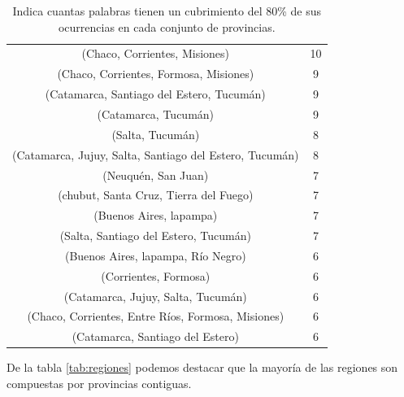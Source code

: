 \begin{table}[]
\begin{tabular}{|c|c|}
(Chaco, Corrientes, Misiones)                          & 10          \\
(Chaco, Corrientes, Formosa, Misiones)                 & 9           \\
(Catamarca, Santiago del Estero, Tucumán)              & 9           \\
(Catamarca, Tucumán)                                   & 9           \\
(Salta, Tucumán)                                       & 8           \\
(Catamarca, Jujuy, Salta, Santiago del Estero, Tucumán)& 8           \\
(Neuquén, San Juan)                                    & 7           \\ %
(chubut, Santa Cruz, Tierra del Fuego)                 & 7           \\
(Buenos Aires, lapampa)                                & 7           \\
(Salta, Santiago del Estero, Tucumán)                  & 7           \\
(Buenos Aires, lapampa, Río Negro)                     & 6           \\
(Corrientes, Formosa)                                  & 6           \\
(Catamarca, Jujuy, Salta, Tucumán)                     & 6           \\
(Chaco, Corrientes, Entre Ríos, Formosa, Misiones)     & 6           \\
(Catamarca, Santiago del Estero)                       & 6           \\
\hline
\end{tabular}
\caption{Indica cuantas palabras tienen un cubrimiento del 80\% de sus ocurrencias en cada conjunto de provincias.}
\end{table}

De la tabla \ref{tab:regiones} podemos destacar que la mayoría de las regiones son compuestas por provincias contiguas.

